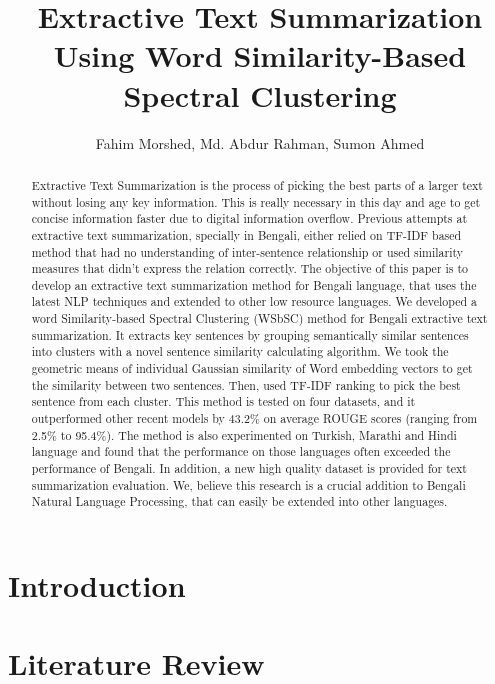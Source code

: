 \documentclass[11pt]{article}
\title{Extractive Text Summarization Using Word Similarity-Based Spectral Clustering}
\author{Fahim Morshed, Md. Abdur Rahman, Sumon Ahmed}
\begin{document}
    \maketitle
    \setlength{\parindent}{0pt}
    \begin{abstract} 
        Extractive Text Summarization is the process of picking the best parts of a  larger text without losing any key information. This is really necessary in this day and age to get concise information faster due to digital information overflow. Previous attempts at extractive text summarization, specially in Bengali,  either relied on TF-IDF based  method that had no understanding of inter-sentence relationship or used similarity  measures that didn't express the relation correctly. The objective of this paper is to develop an extractive text summarization method  for Bengali language, that uses the latest NLP techniques and extended to other low resource languages. We developed a word Similarity-based Spectral Clustering (WSbSC) method for  Bengali extractive text summarization. It extracts key sentences by grouping semantically similar sentences into clusters  with a novel sentence similarity calculating algorithm. We took the geometric means of individual Gaussian similarity of Word embedding  vectors to get the similarity between two sentences. Then, used TF-IDF ranking to pick the best sentence from each cluster. This method is tested on four datasets, and it outperformed other recent models by 43.2\% on average ROUGE scores (ranging from 2.5\% to 95.4\%). The method is also experimented on Turkish, Marathi and Hindi language and found that the performance on those languages often exceeded the performance of Bengali. In addition, a new high quality dataset is provided for text summarization evaluation. We, believe this research is a crucial addition to Bengali Natural Language Processing, that can easily be extended into other languages.
    \end{abstract}

    \section{Introduction}\label{sec:introduction}
    

    \section{Literature Review}\label{sec:literature-review}
    
\end{document}
